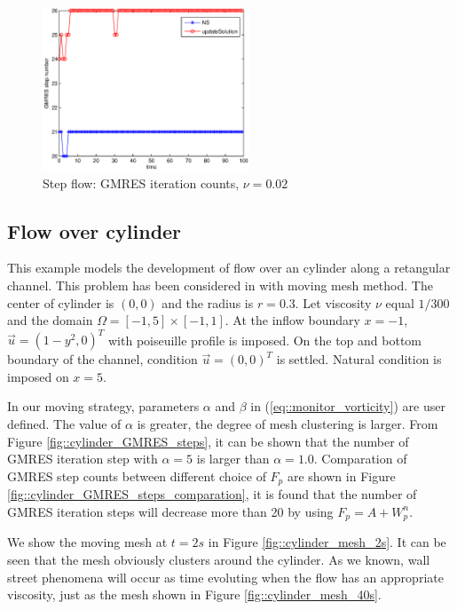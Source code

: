 \documentclass{eajam}
\begin{document}
      \begin{figure}[!htbp]
        \centering
        \includegraphics[width = 0.55\textwidth, angle = 0]{picture/L_shaped_flow_data/iterate_steps.eps}
        \caption{\small Step flow: GMRES iteration counts, $\nu = 0.02$}
        \label{fig::GMRES_steps_total}
      \end{figure}

   \subsection{Flow over cylinder}
   
      This example models the development of flow over an cylinder
      along a retangular channel. This problem has been considered in
      \cite{cao1999anr} with moving mesh method. The center of
      cylinder is $(0, 0)$ and the radius is $r = 0.3$. Let viscosity
      $\nu$  equal  $1 / 300$ and the domain $\Omega = [-1, 5] \times [-1, 1]$. 
      At the inflow boundary $x = -1$, $\vec{u} = (1 - y^2, 0)^T$ with
      poiseuille profile is imposed. On the top and bottom boundary
      of the channel, condition $\vec{u} = (0, 0)^T$ is
      settled. Natural condition is imposed on $x = 5$. 
      
      In our moving strategy, parameters $\alpha$ and
      $\beta$ in (\ref{eq::monitor_vorticity}) are user defined. The
      value of $\alpha$ is greater, the degree of mesh clustering is
      larger. From Figure \ref{fig::cylinder_GMRES_steps}, it can be
      shown that the number of GMRES iteration step with $\alpha = 5$
      is larger than $\alpha = 1.0$. Comparation of GMRES step counts between different
      choice of $F_p$ are shown in Figure 
      \ref{fig::cylinder_GMRES_steps_comparation}, it is found that
      the number of GMRES iteration steps will decrease more than 20 by  
      using $F_p = A + W_p^n$.

      We show the moving mesh at $t = 2s$ in Figure
      \ref{fig::cylinder_mesh_2s}. It can be seen that the mesh obviously
      clusters around the cylinder. As we known, wall street phenomena
      will occur as time evoluting when the flow has an appropriate
      viscosity, just as the mesh shown in Figure \ref{fig::cylinder_mesh_40s}.
      
\end{document}

